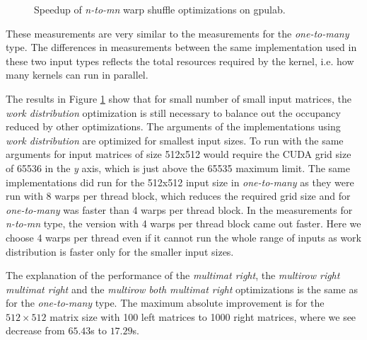 \begin{figure}[ht]
	\centering	
	\begin{subfigure}{0.49\textwidth}
		\centering
		\def\svgwidth{\textwidth}
		
	\end{subfigure}
	\hfill
	\begin{subfigure}{0.49\textwidth}
		\centering
		\def\svgwidth{\textwidth}
		
	\end{subfigure}
	\hfill
	\begin{subfigure}{0.49\textwidth}
		\centering
		\def\svgwidth{\textwidth}
		
	\end{subfigure}
	
	\caption{Speedup of \textit{n-to-mn} warp shuffle optimizations on gpulab.}
	\label{fig:warp_shuffle_n_to_mn_results}
\end{figure}

These measurements are very similar to the measurements for the \textit{one-to-many} type. The differences in measurements between the same implementation used in these two input types reflects the total resources required by the kernel, i.e. how many kernels can run in parallel.


The results in Figure \ref{fig:warp_shuffle_n_to_mn_results} show that for small number of small input matrices, the \textit{work distribution} optimization is still necessary to balance out the occupancy reduced by other optimizations. The arguments of the implementations using \textit{work distribution} are optimized for smallest input sizes. To run with the same arguments for input matrices of size 512x512 would require the CUDA grid size of 65536 in the \textit{y} axis, which is just above the 65535 maximum limit. The same implementations did run for the 512x512 input size in \textit{one-to-many} as they were run with 8 warps per thread block, which reduces the required grid size and for \textit{one-to-many} was faster than 4 warps per thread block. In the measurements for \textit{n-to-mn} type, the version with 4 warps per thread block came out faster. 
Here we choose 4 warps per thread even if it cannot run the whole range of inputs as work distribution is faster only for the smaller input sizes.

The explanation of the performance of the \textit{multimat right}, the \textit{multirow right multimat right} and the \textit{multirow both multimat right} optimizations is the same as for the \textit{one-to-many} type. %
The maximum absolute improvement is for the $512 \times 512$ matrix size with 100 left matrices to 1000 right matrices, where we see decrease from $65.43$s to $17.29$s.


